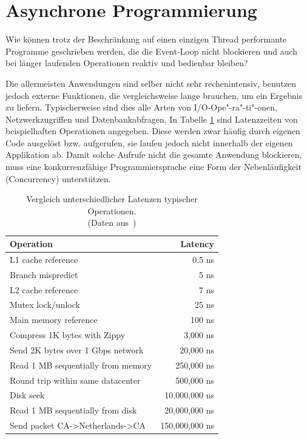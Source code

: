 \documentclass[
11pt, %
a4paper, %
oneside, %
pdfspacing, %
headinclude,
BCOR5mm, %
ngerman, %
bibtotocnumbered,
]{scrartcl}
\begin{document}
\section{Asynchrone Programmierung}
		Wie können trotz der Beschränkung auf einen einzigen Thread performante Programme geschrieben werden, die die Event-Loop nicht blockieren und auch bei länger laufenden Operationen reaktiv und bedienbar bleiben? 
		
		Die allermeisten Anwendungen sind selber nicht sehr rechenintensiv, benutzen jedoch externe Funktionen, die vergleichsweise lange brauchen, um ein Ergebnis zu liefern. Typischerweise sind dies alle Arten von I/O-Ope"-ra"-ti"-onen, Netzwerkzugriffen und Datenbankabfragen. 
		In Tabelle \ref{tab:latencies} sind Latenzzeiten von beispielhaften Operationen angegeben. Diese werden zwar häufig durch eigenen Code ausgelöst bzw. aufgerufen, sie laufen jedoch nicht innerhalb der eigenen Applikation ab.
		Damit solche Aufrufe nicht die gesamte Anwendung blockieren, muss eine konkurrenzfähige Programmiersprache eine Form der Nebenläufigkeit (Concurrency) unterstützen.
			
		\begin{table}[h]\centering
			\begin{tabular}{l|r}
				\hline
				\textbf{Operation} & \textbf{Latency} \\
				\hline\hline
				L1 cache reference &     0.5 ns \\
				\hline
				Branch mispredict &       5 ns \\
				\hline
				L2 cache reference &       7 ns \\
				\hline
				Mutex lock/unlock &      25 ns \\
				\hline
				Main memory reference &     100 ns \\
				\hline
				Compress 1K bytes with Zippy &   3,000 ns \\
				\hline
				Send 2K bytes over 1 Gbps network &  20,000 ns \\
				\hline
				Read 1 MB sequentially from memory & 250,000 ns \\
				\hline
				Round trip within same datacenter & 500,000 ns \\
				\hline
				Disk seek & 10,000,000 ns \\
				\hline
				Read 1 MB sequentially from disk & 20,000,000 ns \\
				\hline
				Send packet CA->Netherlands->CA & 150,000,000 ns \\
				\hline
			\end{tabular}  
			\caption[Vergleich unterschiedlicher Latenzen typischer Operationen]{Vergleich unterschiedlicher Latenzen typischer Operationen. \protect\\(Daten aus~\citep[S.~13]{Dean.2007})}
			\label{tab:latencies}
		\end{table}
		
\end{document}
